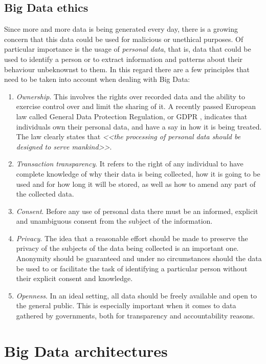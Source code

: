 \subsection{Big Data ethics}

Since more and more data is being generated every day, there is a growing concern that this data could be used for malicious or unethical purposes. Of particular importance is the usage of \textit{personal data}, that is, data that could be used to identify a person or to extract information and patterns about their behaviour unbeknownst to them. In this regard there are a few principles that need to be taken into account when dealing with Big Data:

\begin{enumerate}[1.]
  \item \textit{Ownership}. This involves the rights over recorded data and the ability to exercise control over and limit the sharing of it. A recently passed European law called General Data Protection Regulation, or GDPR \cite{eu2016gdpr}, indicates that individuals own their personal data, and have a say in how it is being treated. The law clearly states that \textit{<<the processing of personal data should be designed to serve mankind>>}.
  \item \textit{Transaction transparency}. It refers to the right of any individual to have complete knowledge of why their data is being collected, how it is going to be used and for how long it will be stored, as well as how to amend any part of the collected data.
  \item \textit{Consent}. Before any use of personal data there must be an informed, explicit and unambiguous consent from the subject of the information.
  \item \textit{Privacy}. The idea that a reasonable effort should be made to preserve the privacy of the subjects of the data being collected is an important one. Anonymity should be guaranteed and under no circumstances should the data be used to or facilitate the task of identifying a particular person without their explicit consent and knowledge.
  \item \textit{Openness}. In an ideal setting, all data should be freely available and open to the general public. This is especially important when it comes to data gathered by governments, both for transparency and accountability reasons.
\end{enumerate}

\section{Big Data architectures}

